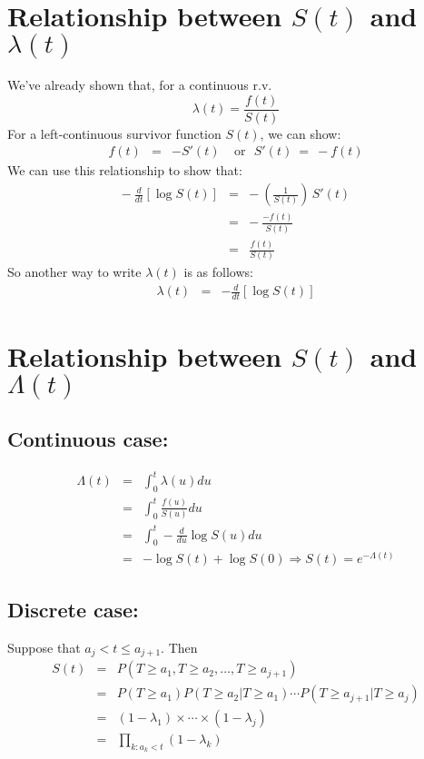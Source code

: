 \documentclass[11pt,slidesonly,semrot,portrait,palatino]{book}
\begin{document}
\section{Relationship between $S(t)$ and $\lambda(t)$}

We've already shown that, for a continuous r.v.
$$\lambda(t)=\frac{f(t)}{S(t)}$$
For a left-continuous survivor function $S(t)$, we can show:
\begin{eqnarray*}
f(t) & = & - S'(t) ~~~~~\mbox{or}~~~ S'(t) ~ = ~ -f(t)
\end{eqnarray*}
We can use this relationship to show that:
\begin{eqnarray*}
- ~ \frac{d}{dt} [\log S(t)] & = &
- ~ \left(\frac{1}{S(t)}\right)\, S'(t)\\[1ex]
& = & - ~\frac{-f(t)}{S(t)} \\[1ex]
& = & \frac{f(t)}{S(t)}
\end{eqnarray*}
So another way to write $\lambda(t)$ is as follows:
\begin{eqnarray*}
\lambda(t) & = & - \frac{d}{dt} [\log S(t)]
\end{eqnarray*}
\section{Relationship between $S(t)$ and $\Lambda(t)$}
\subsection{Continuous case:}
\begin{eqnarray*}
\Lambda(t) & = & \int_0^t \lambda(u)du \\[1.5ex]
& = &  \int_0^t\frac{f(u)}{S(u)}du \\[1.5ex]
& = & \int_0^t -\frac{d}{du} \log S(u) du \\[1.5ex]
& = & -\log S(t)+\log S(0)\Rightarrow S(t)=e^{-\Lambda(t)}
\end{eqnarray*}
\subsection{Discrete case:} Suppose that $a_j<t\le a_{j+1}$.  Then
\begin{eqnarray*}
S(t) & = & P(T\ge a_1, T\ge a_2, \ldots, T\ge a_{j+1}) \\[1ex]
& = & P(T\ge a_1)P(T\ge a_2|T\ge a_1) \cdots
P(T\ge a_{j+1}|T\ge a_j)\\[1ex]
& = & (1-\lambda_1)\times \cdots \times (1-\lambda_j)\\[1ex]
& = & \prod_{k:a_k<t}(1-\lambda_k)
\end{eqnarray*}
\end{document}
